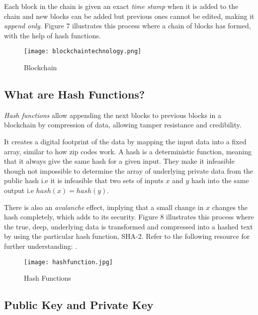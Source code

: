 \documentclass[12pt]{article}
\newcommand{\1}{\mathbbm 1}
\begin{document}
		Each block in the chain is given an exact \textit{time stamp} when it is added to the chain and new blocks can be added but previous ones cannot be edited, making it \textit{append only}. Figure 7 illustrates this process where a chain of blocks has formed, with the help of hash functions.
		
		\begin{figure}[H]
			\begin{Center}
				\texttt{[image: blockchaintechnology.png]}		
				\caption{Blockchain}
			\end{Center}
		\end{figure}
		
		\subsection{\textbf{What are Hash Functions?}}
		
		\textit{Hash functions} allow appending the next blocks to previous blocks in a blockchain by compression of data, allowing tamper resistance and credibility. 
		
		It creates a digital footprint of the data by mapping the input data into a fixed array, similar to how zip codes work. A hash is a deterministic function, meaning that it always give the same hash for a given input. They make it infeasible though not impossible to determine the array of underlying private data from the public hash i.e it is infeasible that two sets of inputs $x$ and $y$ hash into the same output i.e $hash(x) = hash(y)$.
		
		There is also an \textit{avalanche} effect, implying that a small change in $x$ changes the hash completely, which adds to its security. Figure 8 illustrates this process where the true, deep, underlying data is transformed and compressed into a hashed text by using the particular hash function, SHA-2. Refer to the following resource for further understanding:
		{\color{blue}{https://www.youtube.com/watch?v=160oMzblY8}}.
		
		
		
		\begin{figure}[H]
			\begin{Center}
				\texttt{[image: hashfunction.jpg]}		
				\caption{Hash Functions}
			\end{Center}
		\end{figure}
		
		
		\subsection{\textbf{Public Key and Private Key}}
		
\end{document}
